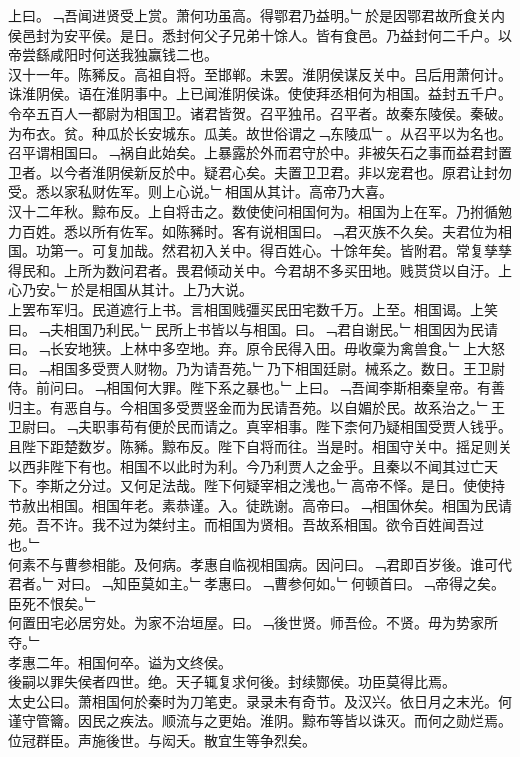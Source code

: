 \documentclass{zhvt-classic}
\begin{document}
\hspace*{2em}上曰。﹁吾闻进贤受上赏。萧何功虽高。得鄂君乃益明。﹂於是因鄂君故所食关内侯邑封为安平侯。是日。悉封何父子兄弟十馀人。皆有食邑。乃益封何二千户。以帝尝繇咸阳时何送我独赢钱二也。\\
\hspace*{2em}汉十一年。陈豨反。高祖自将。至邯郸。未罢。淮阴侯谋反关中。吕后用萧何计。诛淮阴侯。语在淮阴事中。上已闻淮阴侯诛。使使拜丞相何为相国。益封五千户。令卒五百人一都尉为相国卫。诸君皆贺。召平独吊。召平者。故秦东陵侯。秦破。为布衣。贫。种瓜於长安城东。瓜美。故世俗谓之﹁东陵瓜﹂。从召平以为名也。召平谓相国曰。﹁祸自此始矣。上暴露於外而君守於中。非被矢石之事而益君封置卫者。以今者淮阴侯新反於中。疑君心矣。夫置卫卫君。非以宠君也。原君让封勿受。悉以家私财佐军。则上心说。﹂相国从其计。高帝乃大喜。\\
\hspace*{2em}汉十二年秋。黥布反。上自将击之。数使使问相国何为。相国为上在军。乃拊循勉力百姓。悉以所有佐军。如陈豨时。客有说相国曰。﹁君灭族不久矣。夫君位为相国。功第一。可复加哉。然君初入关中。得百姓心。十馀年矣。皆附君。常复孳孳得民和。上所为数问君者。畏君倾动关中。今君胡不多买田地。贱贳贷以自汙。上心乃安。﹂於是相国从其计。上乃大说。\\
\hspace*{2em}上罢布军归。民道遮行上书。言相国贱彊买民田宅数千万。上至。相国谒。上笑曰。﹁夫相国乃利民。﹂民所上书皆以与相国。曰。﹁君自谢民。﹂相国因为民请曰。﹁长安地狭。上林中多空地。弃。原令民得入田。毋收稾为禽兽食。﹂上大怒曰。﹁相国多受贾人财物。乃为请吾苑。﹂乃下相国廷尉。械系之。数日。王卫尉侍。前问曰。﹁相国何大罪。陛下系之暴也。﹂上曰。﹁吾闻李斯相秦皇帝。有善归主。有恶自与。今相国多受贾竖金而为民请吾苑。以自媚於民。故系治之。﹂王卫尉曰。﹁夫职事苟有便於民而请之。真宰相事。陛下柰何乃疑相国受贾人钱乎。且陛下距楚数岁。陈豨。黥布反。陛下自将而往。当是时。相国守关中。摇足则关以西非陛下有也。相国不以此时为利。今乃利贾人之金乎。且秦以不闻其过亡天下。李斯之分过。又何足法哉。陛下何疑宰相之浅也。﹂高帝不怿。是日。使使持节赦出相国。相国年老。素恭谨。入。徒跣谢。高帝曰。﹁相国休矣。相国为民请苑。吾不许。我不过为桀纣主。而相国为贤相。吾故系相国。欲令百姓闻吾过也。﹂\\
\hspace*{2em}何素不与曹参相能。及何病。孝惠自临视相国病。因问曰。﹁君即百岁後。谁可代君者。﹂对曰。﹁知臣莫如主。﹂孝惠曰。﹁曹参何如。﹂何顿首曰。﹁帝得之矣。臣死不恨矣。﹂\\
\hspace*{2em}何置田宅必居穷处。为家不治垣屋。曰。﹁後世贤。师吾俭。不贤。毋为势家所夺。﹂\\
\hspace*{2em}孝惠二年。相国何卒。谥为文终侯。\\
\hspace*{2em}後嗣以罪失侯者四世。绝。天子辄复求何後。封续酂侯。功臣莫得比焉。\\
\hspace*{2em}太史公曰。萧相国何於秦时为刀笔吏。录录未有奇节。及汉兴。依日月之末光。何谨守管籥。因民之疾法。顺流与之更始。淮阴。黥布等皆以诛灭。而何之勋烂焉。位冠群臣。声施後世。与闳夭。散宜生等争烈矣。\\
\end{document}
